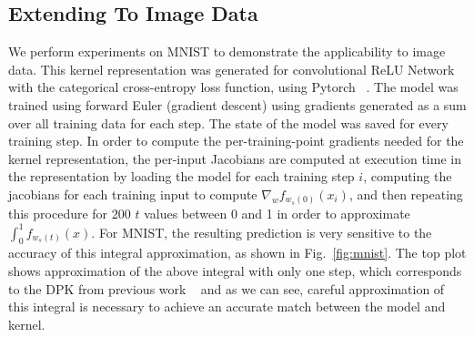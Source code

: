 \subsection{Extending To Image Data}
    We perform experiments on MNIST to demonstrate the applicability to image data. 
    This kernel representation was generated for convolutional ReLU Network with the categorical cross-entropy loss function, using Pytorch ~\citep{pytorch2019}. 
    The model was trained using forward Euler (gradient descent) using gradients generated as a sum over all training data for each step. 
    The state of the model was saved for every training step. In order to compute the per-training-point gradients needed for the kernel representation, the per-input Jacobians are computed at execution time in the representation by loading the model for each training step $i$, computing the jacobians for each training input to compute $\nabla_w f_{w_s(0)}(x_i)$, and then repeating this procedure for 200 $t$ values between 0 and 1 in order to approximate $\int_0^1 f_{w_s(t)}(x)$. For MNIST, the resulting prediction is very sensitive to the accuracy of this integral approximation, as shown in Fig.~\ref{fig:mnist}. The top plot shows approximation of the above integral with only one step, which corresponds to the DPK from previous work ~\citep{chen2021equivalence, domingos2020, incudini2022quantum} and as we can see, careful approximation of this integral is necessary to achieve an accurate match between the model and kernel. 


